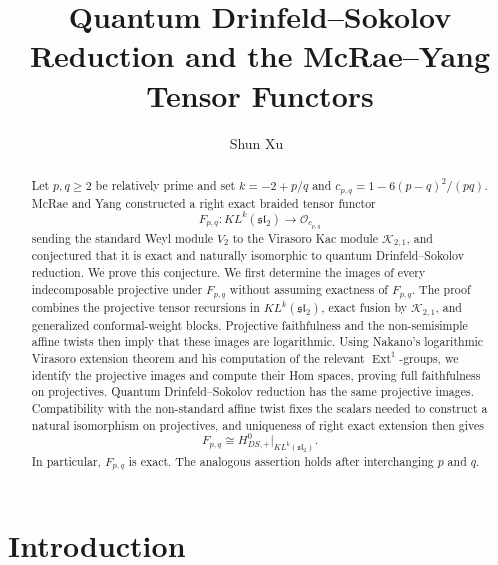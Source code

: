 \documentclass[12pt,leqno]{amsart}
\numberwithin{equation}{section}
\newcommand{\Ext}{\operatorname{Ext}}
\newcommand{\KL}{KL}
\newcommand{\Oc}{\mathcal O}
\newcommand{\Kac}{\mathcal K}
\begin{document}
\title{Quantum Drinfeld--Sokolov Reduction and the McRae--Yang Tensor Functors}

\author{Shun Xu~}

\address{School of Mathematical Sciences, Anhui University, Anhui, Hefei, 230601, China}




\begin{abstract}
Let $p,q\geq2$ be relatively prime and set $k=-2+p/q$ and
$c_{p,q}=1-6(p-q)^2/(pq)$.  McRae and Yang constructed a right exact
braided tensor functor
\[
 F_{p,q}:\KL^k(\mathfrak{sl}_2)\longrightarrow\Oc_{c_{p,q}}
\]
sending the standard Weyl module $V_2$ to the Virasoro Kac module
$\Kac_{2,1}$, and conjectured that it is exact and naturally isomorphic to
quantum Drinfeld--Sokolov reduction.  We prove this conjecture.  We first
determine the images of every indecomposable projective under $F_{p,q}$
without assuming exactness of $F_{p,q}$.  The proof combines the projective
tensor recursions in $\KL^k(\mathfrak{sl}_2)$, exact fusion by $\Kac_{2,1}$,
and generalized conformal-weight blocks.  Projective faithfulness and the
non-semisimple affine twists then imply that these images are logarithmic.
Using Nakano's logarithmic Virasoro extension theorem and his computation of
the relevant $\Ext^1$-groups, we identify the projective images and compute
their Hom spaces, proving full faithfulness on projectives.  Quantum
Drinfeld--Sokolov reduction has the same projective images.  Compatibility
with the non-standard affine twist fixes the scalars needed to construct a
natural isomorphism on projectives, and uniqueness of right exact extension
then gives
\[
 F_{p,q}\cong H^0_{DS,+}\big|_{\KL^k(\mathfrak{sl}_2)}.
\]
In particular, $F_{p,q}$ is exact.  The analogous assertion holds after
interchanging $p$ and $q$.
\end{abstract}

\maketitle

\section{Introduction}
\end{document}

